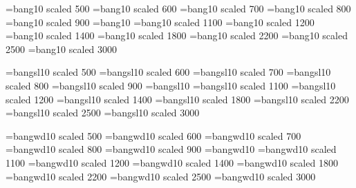 
\def\sbng{\bngviii}
\def\tbng{\bngvi}
\def\bng{\bngx}
\def\lbng{\bngxiv}
\def\Lbng{\bngxviii}
\def\LBng{\bngxxii}
\def\hbng{\bngxxv}
\def\Hbng{\bngxxx}
%
\def\sbns{\bnsviii}
\def\tbns{\bnsvi}
\def\bns{\bnsx}
\def\lbns{\bnsxiv}
\def\Lbns{\bnsxviii}
\def\LBns{\bnsxxii}
\def\hbns{\bnsxxv}
\def\Hbns{\bnsxxx}
%
\def\sbnw{\bnwviii}
\def\tbnw{\bnwvi}
\def\bnw{\bnwx}
\def\lbnw{\bnwxiv}
\def\Lbnw{\bnwxviii}
\def\LBnw{\bnwxxii}
\def\hbnw{\bnwxxv}
\def\Hbnw{\bnwxxx}




\font\bngv=bang10 scaled 500
\font\bngvi=bang10 scaled 600
\font\bngvii=bang10 scaled 700
\font\bngviii=bang10 scaled 800
\font\bngix=bang10 scaled 900
\font\bngx=bang10
\font\bngxi=bang10 scaled 1100
\font\bngxii=bang10 scaled 1200
\font\bngxiv=bang10 scaled 1400
\font\bngxviii=bang10 scaled 1800
\font\bngxxii=bang10 scaled 2200
\font\bngxxv=bang10 scaled 2500
\font\bngxxx=bang10 scaled 3000

\font\bnsv=bangsl10 scaled 500
\font\bnsvi=bangsl10 scaled 600
\font\bnsvii=bangsl10 scaled 700
\font\bnsviii=bangsl10 scaled 800
\font\bnsix=bangsl10 scaled 900
\font\bnsx=bangsl10
\font\bnsxi=bangsl10 scaled 1100
\font\bnsxii=bangsl10 scaled 1200
\font\bnsxiv=bangsl10 scaled 1400
\font\bnsxviii=bangsl10 scaled 1800
\font\bnsxxii=bangsl10 scaled 2200
\font\bnsxxv=bangsl10 scaled 2500
\font\bnsxxx=bangsl10 scaled 3000

\font\bnwv=bangwd10 scaled 500
\font\bnwvi=bangwd10 scaled 600
\font\bnwvii=bangwd10 scaled 700
\font\bnwviii=bangwd10 scaled 800
\font\bnwix=bangwd10 scaled 900
\font\bnwx=bangwd10
\font\bnwxi=bangwd10 scaled 1100
\font\bnwxii=bangwd10 scaled 1200
\font\bnwxiv=bangwd10 scaled 1400
\font\bnwxviii=bangwd10 scaled 1800
\font\bnwxxii=bangwd10 scaled 2200
\font\bnwxxv=bangwd10 scaled 2500
\font\bnwxxx=bangwd10 scaled 3000



\def\*#1*#2{o\null{#2}{#1}}

\def\d#1{\oalign{\smash{#1}\crcr\hidewidth{$\!$\rm.}\hidewidth}}


\def\sh#1{\setbox0=\hbox{#1}%
     \kern-.02em\copy0\kern-\wd0
     \kern.04em\copy0\kern-\wd0
     \kern-.02em\raise.0433em\box0 }